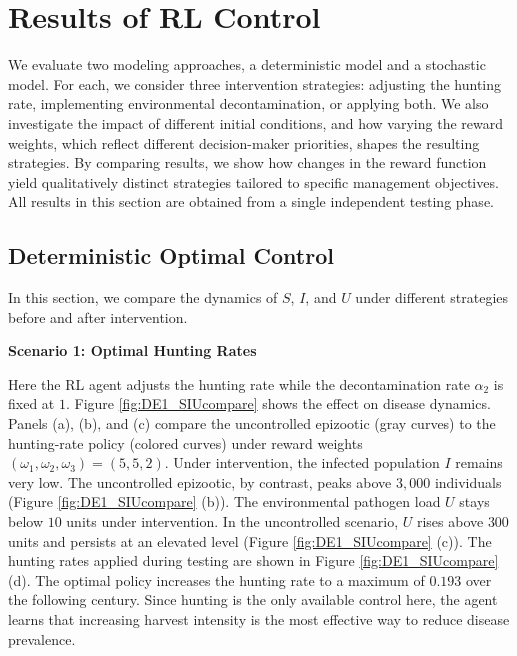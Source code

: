 \documentclass[12pt,a4paper,reqno]{amsart}
\theoremstyle{definition}
\theoremstyle{remark}
\theoremstyle{plain}
\begin{document}
\section{Results of RL Control}\label{Sec:Res}
We evaluate two modeling approaches, a deterministic model and a stochastic model. For each, we consider three intervention strategies: adjusting the hunting rate, implementing environmental decontamination, or applying both. We also investigate the impact of different initial conditions, and how varying the reward weights, which reflect different decision-maker priorities, shapes the resulting strategies. By comparing results, we show how changes in the reward function yield qualitatively distinct strategies tailored to specific management objectives. All results in this section are obtained from a single independent testing phase.

\subsection{Deterministic Optimal Control}
In this section, we compare the dynamics of $S$, $I$, and $U$ under different strategies before and after intervention.

\textbf{Scenario 1: Optimal Hunting Rates}

Here the RL agent adjusts the hunting rate while the decontamination rate $\alpha_2$ is fixed at $1$. Figure \ref{fig:DE1_SIUcompare} shows the effect on disease dynamics. Panels (a), (b), and (c) compare the uncontrolled epizootic (gray curves) to the hunting-rate policy (colored curves) under reward weights $(\omega_1, \omega_2, \omega_3) = (5, 5, 2)$. Under intervention, the infected population $I$ remains very low. The uncontrolled epizootic, by contrast, peaks above $3,000$ individuals (Figure \ref{fig:DE1_SIUcompare} (b)). The environmental pathogen load $U$ stays below $10$ units under intervention. In the uncontrolled scenario, $U$ rises above $300$ units and persists at an elevated level (Figure \ref{fig:DE1_SIUcompare} (c)). The hunting rates applied during testing are shown in Figure \ref{fig:DE1_SIUcompare} (d). The optimal policy increases the hunting rate to a maximum of $0.193$ over the following century. Since hunting is the only available control here, the agent learns that increasing harvest intensity is the most effective way to reduce disease prevalence.
\end{document}
